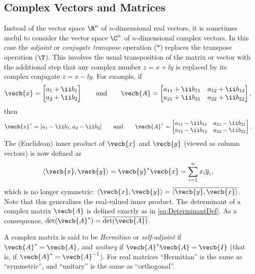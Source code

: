 \subsection{Complex Vectors and Matrices}\label{sec:ComplexVectorsMatrices}
Instead of the vector space $\R^n$ of $n$-dimensional real vectors, it is sometimes useful to consider the vector space $\C^n$ of $n$-dimensional complex vectors. In this case the \textit{adjoint} or \textit{conjugate transpose} operation ($*$) replaces the transpose operation ($\T$). This involves the usual transposition of the matrix or vector with the additional step that any complex number $z = x + \ii y$ is replaced by its complex conjugate $\overline{z} = x - \ii y$. For example, if
\begin{equation*}
	\vecb{x} =
	\begin{bmatrix}
		a_1 + \ii b_1 \\
		a_2 + \ii b_2
	\end{bmatrix}
	\qquad \text{and} \qquad
	\vecb{A} =
	\begin{bmatrix}
		a_{11} + \ii b_{11} & a_{12} + \ii b_{12} \\
		a_{21} + \ii b_{21} & a_{22} + \ii b_{22}
	\end{bmatrix},
\end{equation*}
then
\begin{equation*}
	\vecb{x}^* = [a_1 - \ii b_1, a_2 - \ii b_2]
	\qquad \text{and} \qquad
	\vecb{A}^* =
	\begin{bmatrix}
		a_{11} - \ii b_{11} & a_{21} - \ii b_{21} \\
		a_{12} - \ii b_{12} & a_{22} - \ii b_{22}
	\end{bmatrix}.
\end{equation*}
The (Euclidean) inner product of $\vecb{x}$ and $\vecb{y}$ (viewed as column vectors) is now defined as
\begin{equation*}
	\langle \vecb{x}, \vecb{y} \rangle = \vecb{y}^* \vecb{x} = \sum_{i=1}^n x_i \overline{y}_i,
\end{equation*}
which is no longer symmetric: $\langle \vecb{x}, \vecb{y} \rangle = \overline{\langle \vecb{y}, \vecb{x} \rangle}$. Note that this generalizes the real-valued inner product. The determinant of a complex matrix $\vecb{A}$ is defined exactly as in \eqref{eq:DeterminantDef}. As a consequence, $\det(\vecb{A}^*) = \overline{\det(\vecb{A})}$.

A complex matrix is said to be \textit{Hermitian} or \textit{self-adjoint} if $\vecb{A}^* = \vecb{A}$, and \textit{unitary} if $\vecb{A}^* \vecb{A} = \vecb{I}$ (that is, if $\vecb{A}^* = \vecb{A}^{-1}$). For real matrices ``Hermitian'' is the same as ``symmetric'', and ``unitary'' is the same as ``orthogonal''.

